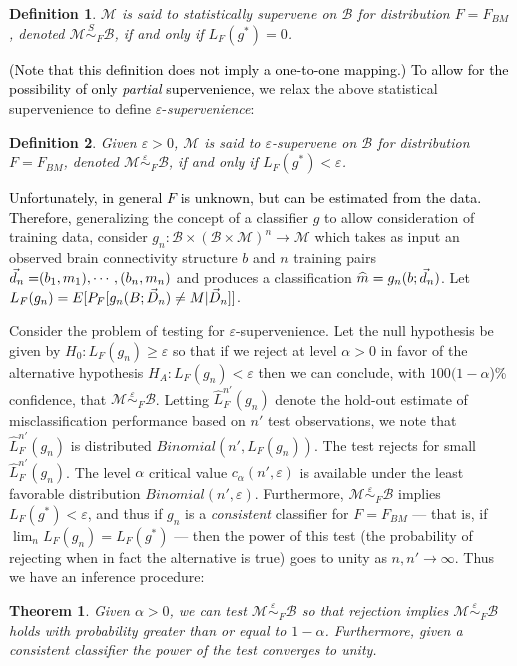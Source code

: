 \documentclass[10pt]{article}
\newcommand{\mB}{\mathcal{B}}
\newcommand{\mM}{\mathcal{M}}
\newcommand{\hL}{\widehat{L}}
\newcommand{\MeB}{\mM \overset{\varepsilon}{{\sim}}_F \mB}
\providecommand{\tr}[1]{\textcolor{black}{#1}}
\newtheorem{defi}{Definition}
\newtheorem{thm}{Theorem}
\begin{document}
\begin{defi}
\label{def1} 
$\mM$ is said to \textit{statistically supervene} on $\mB$ for distribution $F=F_{BM}$, denoted $\mM \overset{S}{\sim}_F \mB$, if and only if $L_{F}(g^*) = 0$.
\end{defi}

\tr{(Note that this definition does not imply a one-to-one mapping.)}  \tr{To allow for the possibility of only \emph{partial} supervenience,}  we relax the above statistical supervenience to define $\varepsilon$-\textit{supervenience}:

\begin{defi}
\label{def2}
Given $\varepsilon > 0$, $\mM$ is said to $\varepsilon$-\textit{supervene} on $\mB$ for distribution $F=F_{BM}$, denoted $\MeB$, if and only if $L_{F}(g^*) < \varepsilon$.
\end{defi}

\tr{Unfortunately, in general $F$ is unknown, but can be estimated from the data. Therefore,} generalizing the concept of a classifier $g$ to allow consideration of training data, consider $g_n:\mB \times (\mB \times \mM)^n \rightarrow \mM$ which takes as input an observed brain connectivity structure $b$ and $n$ training pairs $\tr{\vec{d}_n=}(b_1,m_1),\cdots,(b_n,m_n)$ and produces a classification $\widehat{m}=g_n(b;\tr{\vec{d}_n})$. Let $L_{F}(g_n) = E[P_{F}[g_n(B;\tr{\vec{D}_n}) \neq M|\tr{\vec{D}_n}]]$.

Consider the problem of testing for $\varepsilon$-supervenience. Let the null hypothesis be given by $H_0: L_{F}(g_n) \geq \varepsilon$ so that if we reject at level $\alpha >0$ in favor of the alternative hypothesis $H_A: L_{F}(g_n) < \varepsilon$ then we can conclude, with $100(1-\alpha$)\% confidence, that $\MeB$. Letting $\hL^{n'}_{F}(g_n)$ denote the hold-out estimate of misclassification performance based on $n'$ test observations, we note that $\hL^{n'}_{F}(g_n)$ is distributed $Binomial(n',L_{F}(g_n))$. The test rejects for small $\hL^{n'}_{F}(g_n)$. The level $\alpha$ critical value $c_{\alpha}(n',\varepsilon)$ is available under the least favorable distribution $Binomial(n',\varepsilon)$. Furthermore, $\MeB$ implies $L_{F}(g^*) < \varepsilon$, and thus if $g_n$ is a {\it consistent} classifier for $F=F_{BM}$ --- that is, if $\lim_n L_{F}(g_n) = L_{F}(g^*)$ --- then the power of this test (the probability of rejecting when in fact the alternative is true) goes to unity as $n,n' \rightarrow \infty$. Thus we have an inference procedure: \begin{thm} \label{thm1} Given $\alpha > 0$, we can test $\MeB$ so that rejection implies $\MeB$ holds with probability greater than or equal to $1-\alpha$. Furthermore, given a consistent classifier the power of the test converges to unity. \end{thm}
\end{document}
